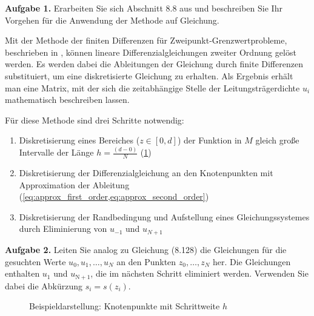 \begin{mybox}
	\textbf{Aufgabe 1.} Erarbeiten Sie sich Abschnitt 8.8 aus
	\cite{Atkinson.2004} und beschreiben Sie Ihr Vorgehen für die Anwendung der
	Methode auf Gleichung.\cite{Prof.Dr.AndreasZeiser.April2021}
\end{mybox}

Mit der Methode der finiten Differenzen für
Zweipunkt-Grenzwertprobleme, beschrieben in \cite[p. 442]{Atkinson.2004},
können lineare Differenzialgleichungen zweiter Ordnung gelöst werden. Es werden
dabei die Ableitungen der Gleichung durch finite Differenzen substituiert, um
eine diskretisierte Gleichung zu erhalten.
Als Ergebnis erhält man eine Matrix, mit der sich die zeitabhängige
Stelle der Leitungsträgerdichte $u_i$ mathematisch beschreiben lassen.

Für diese Methode sind drei Schritte notwendig:
\begin{enumerate}
	\item Diskretisierung eines Bereiches ($z\in [0,d]$) der
	      Funktion in $M$ gleich große Intervalle der Länge $h=\frac{(d-0)}{N}$
	      (\cref{fig:bsp_knotenpunkte})
	\item Diskretisierung der Differenzialgleichung an den
	      Knotenpunkten mit Approximation der Ableitung
	      (\cref{eq:approx_first_order,eq:approx_second_order})
	\item Diskretisierung der Randbedingung und Aufstellung eines
	      Gleichungssystemes durch Eliminierung von $u_{-1}$ und $u_{N+1}$
\end{enumerate}

\begin{mybox}
	\textbf{Aufgabe 2.} Leiten Sie analog zu Gleichung (8.128) die
	Gleichungen für die gesuchten Werte  $u_0, u_1, \dots , u_N$ an den Punkten
	$z_0,\dots, z_N$ her. Die Gleichungen enthalten $u_1$ und $u_\mathrm{N+1}$, die
	im nächsten Schritt eliminiert werden. Verwenden Sie dabei die Abkürzung $ s_i
		= s(z_i)$.\cite{Prof.Dr.AndreasZeiser.April2021}
\end{mybox}

\begin{figure}[htb]
	\centering
	\caption{Beispieldarstellung: Knotenpunkte mit Schrittweite $h$}
	\label{fig:bsp_knotenpunkte}
\end{figure}

